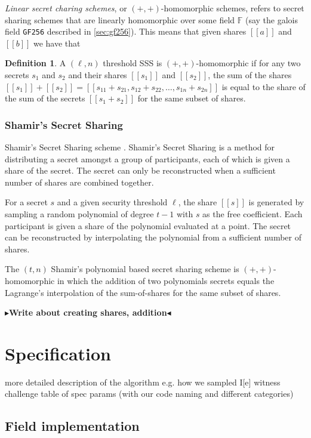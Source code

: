 \documentclass[twoside,11pt,openright]{report}
\theoremstyle{definition}
\newtheorem{definition}{Definition}[section]
\theoremstyle{plain}
\newcommand{\todo}[1]{{\color[rgb]{.5,0,0}\textbf{$\blacktriangleright$#1$\blacktriangleleft$}}}
\begin{document}
\textit{Linear secret charing schemes}, or $(+,+)$-homomorphic schemes, refers to secret sharing schemes that are linearly homomorphic over some field $\mathbb{F}$ (say the galois field \texttt{GF256} described in \autoref{sec:gf256}). This means that given shares $[[a]]$ and $[[b]]$ we have that
\begin{definition}
  A $(\ell,n)$ threshold SSS is $(+,+)$-homomorphic if for any two secrets $s_1$ and $s_2$ and their shares $[[s_1]]$ and $[[s_2]]$, the sum of the shares $[[s_1]] + [[s_2]] = [[s_{11} + s_{21}, s_{12} + s_{22}, \dots, s_{1n} + s_{2n}]]$ is equal to the share of the sum of the secrets $[[s_1 + s_2]]$ for the same subset of shares.
\end{definition}
\subsection{Shamir's Secret Sharing}
\label{sec:shamir}

Shamir's Secret Sharing scheme \cite{shamir1979share}. Shamir's Secret Sharing is a method for distributing a secret amongst a group of participants, each of which is given a share of the secret. The secret can only be reconstructed when a sufficient number of shares are combined together.

For a secret $s$ and a given security threshold $\ell$, the share $[[s]]$ is generated by sampling a random polynomial of degree $t-1$ with $s$ as the free coefficient. Each participant is given a share of the polynomial evaluated at a point. The secret can be reconstructed by interpolating the polynomial from a sufficient number of shares.

The $(t,n)$ Shamir's polynomial based secret sharing scheme is $(+,+)$-homomorphic in which the addition of two polynomials secrets equals the Lagrange's interpolation of the sum-of-shares for the same subset of shares.

\todo{Write about creating shares, addition}


\chapter{Specification}
\label{ch:spec}
more detailed description of the algorithm
e.g. how we sampled I[e] witness challenge
table of spec params (with our code naming and different categories)

\section{Field implementation}
\end{document}
